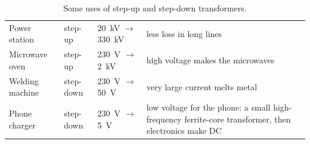 \begin{table}
  \caption{Some uses of step-up and step-down transformers.}\label{ch4:tab:uses}
  \centering\small
  \begin{tabular}{@{}L{27mm}L{17mm}L{26mm}L{65mm}@{}}
    \toprule
     &  &  & \\
    \midrule
    Power station & step-up & \qty{20}{kV} $\to$ \qty{330}{kV} & less loss in long lines\\
    Microwave oven & step-up & \qty{230}{V} $\to$ \qty{2}{kV} & high voltage makes the microwaves\\
    Welding machine & step-down & \qty{230}{V} $\to$ \qty{50}{V} & very large current melts metal\\
    Phone charger & step-down & \qty{230}{V} $\to$ \qty{5}{V} & low voltage for the phone: a
      small high-frequency ferrite-core transformer, then electronics make DC\\
    \bottomrule
  \end{tabular}
\end{table}

